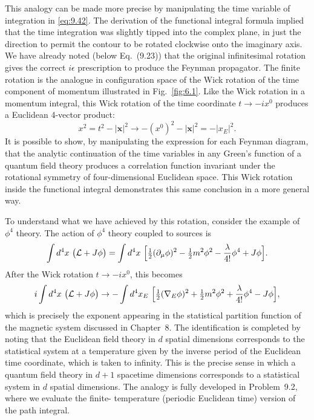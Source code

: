 This analogy can be made more precise by manipulating the time variable of
integration in \eqref{eq:9.42}.  The derivation of the functional integral
formula implied that the time integration was slightly tipped into the complex
plane, in just the direction to permit the contour to be rotated clockwise
onto the imaginary axis.  We have already noted (below Eq.~(9.23)) that
the original infinitesimal rotation gives the correct $i\epsilon$ prescription
to produce the Feynman propagator.  The finite rotation is the analogue in
configuration space of the Wick rotation of the time component of momentum
illustrated in Fig.~\ref{fig:6.1}.  Like the Wick rotation in a momentum
integral, this Wick rotation of the time coordinate $t\to -ix^0$ produces a
Euclidean 4-vector product:
\begin{equation}
  x^2 = t^2 - |\mathbf{x}|^2 \to -(x^0)^2 - |\mathbf{x}|^2 = -|x_E|^2 .
  \label{eq:9.44}
\end{equation}
It is possible to show, by manipulating the expression for each Feynman
diagram, that the analytic continuation of the time variables in any Green's
function of a quantum field theory produces a correlation function invariant
under the rotational symmetry of four-dimensional Euclidean space.  This Wick
rotation inside the functional integral demonstrates this same conclusion in a
more general way.

To understand what we have achieved by this rotation, consider the example of
$\phi^4$ theory.  The action of $\phi^4$ theory coupled to sources is
\begin{equation}
  \int d^4x\ \bigl( \mathcal{L} + J\phi \bigr) = \int d^4x\ \Bigl[
    \tfrac{1}{2}(\partial_\mu\phi)^2 - \tfrac{1}{2}m^2\phi^2
      - \frac{\lambda}{4!}\phi^4 + J\phi \Bigr] .
\end{equation}
After the Wick rotation $t\to -ix^0$, this becomes
\begin{equation}
  i\int d^4x\ \bigl( \mathcal{L}+J\phi \bigr) \to -\int d^4x_E\ \Bigl[
    \tfrac{1}{2}(\nabla_E\phi)^2 + \tfrac{1}{2}m^2\phi^2
      + \frac{\lambda}{4!}\phi^4 - J\phi \Bigr] ,
\end{equation}
which is precisely the exponent appearing in the statistical partition
function of the magnetic system discussed in Chapter~8.  The identification is
completed by noting that the Euclidean field theory in $d$ spatial dimensions
corresponds to the statistical system at a temperature given by the inverse
period of the Euclidean time coordinate, which is taken to infinity.  This is
the precise sense in which a quantum field theory in $d+1$ spacetime
dimensions corresponds to a statistical system in $d$ spatial dimensions.  The
analogy is fully developed in Problem~9.2, where we evaluate the finite-
temperature (periodic Euclidean time) version of the path integral.

